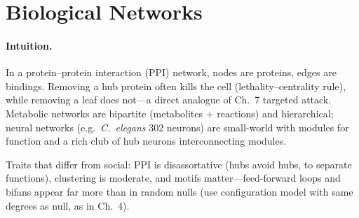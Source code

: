 \section{Biological Networks}
\label{sec:bio}
\paragraph{Intuition.} In a protein--protein interaction (PPI) network, nodes are proteins, edges are bindings. Removing a hub protein often kills the cell (lethality--centrality rule), while removing a leaf does not---a direct analogue of Ch.~7 targeted attack. Metabolic networks are bipartite (metabolites + reactions) and hierarchical; neural networks (e.g.\ \emph{C.~elegans} 302 neurons) are small-world with modules for function and a rich club of hub neurons interconnecting modules.

Traits that differ from social: PPI is disassortative (hubs avoid hubs, to separate functions), clustering is moderate, and motifs matter---feed-forward loops and bifans appear far more than in random nulls (use configuration model with same degrees as null, as in Ch.~4).

